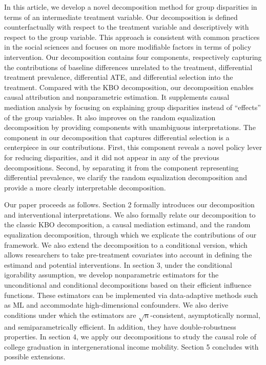 \documentclass[12pt,a4paper]{article}
\begin{document}
In this article, we develop a novel decomposition method for group disparities in terms of an intermediate treatment variable. Our decomposition is defined counterfactually with respect to the treatment variable and descriptively with respect to the group variable. This approach is consistent with common practices in the social sciences and focuses on more modifiable factors in terms of policy intervention. Our decomposition contains four components, respectively capturing the contributions of baseline differences unrelated to the treatment, differential treatment prevalence, differential ATE, and differential selection into the treatment. Compared with the KBO decomposition, our decomposition enables causal attribution and nonparametric estimation. It supplements causal mediation analysis by focusing on explaining group disparities instead of ``effects'' of the group variables. It also improves on the random equalization decomposition by providing components with unambiguous interpretations. The component in our decomposition that captures differential selection is a centerpiece in our contributions. First, this component reveals a novel policy lever for reducing disparities, and it did not appear in any of the previous decompositions. Second, by separating it from the component representing differential prevalence, we clarify the random equalization decomposition and provide a more clearly interpretable decomposition. 

Our paper proceeds as follows. Section 2 formally introduces our decomposition and interventional interpretations. We also formally relate our decomposition to the classic KBO decomposition, a causal mediation estimand, and the random equalization decomposition, through which we explicate the contributions of our framework. We also extend the decomposition to a conditional version, which allows researchers to take pre-treatment covariates into account in defining the estimand and potential interventions. In section 3, under the conditional igorability assumption, we develop nonparametric estimators for the unconditional and conditional decompositions based on their efficient influence functions. These estimators can be implemented via data-adaptive methods such as ML and accommodate high-dimensional confounders. We also derive conditions under which the estimators are $\sqrt{n}$-consistent, asymptotically normal, and semiparametrically efficient. In addition, they have double-robustness properties. In section 4, we apply our decompositions to study the causal role of college graduation in intergenerational income mobility. Section 5 concludes with possible extensions. 
\end{document}
